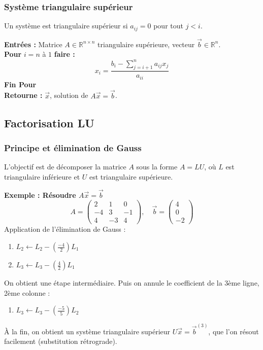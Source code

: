 \subsubsection{Système triangulaire supérieur}
Un système est triangulaire supérieur si $a_{ij} = 0$ pour tout $j < i$.

\begin{algorithme}
\textbf{Entrées :} Matrice $A \in \mathbb{R}^{n \times n}$ triangulaire supérieure, vecteur $\vec{b} \in \mathbb{R}^n$. \\
\textbf{Pour} $i = n$ à $1$ \textbf{faire :}
\[ x_i = \frac{b_i - \sum_{j=i+1}^{n} a_{ij}x_j}{a_{ii}} \]
\textbf{Fin Pour} \\
\textbf{Retourne :} $\vec{x}$, solution de $A\vec{x} = \vec{b}$.
\end{algorithme}

\subsection{Factorisation LU}

\subsubsection{Principe et élimination de Gauss}
L'objectif est de décomposer la matrice $A$ sous la forme $A = LU$, où $L$ est triangulaire inférieure et $U$ est triangulaire supérieure.

\textbf{Exemple : Résoudre $A\vec{x} = \vec{b}$}
\[ 
A = \begin{pmatrix} 2 & 1 & 0 \\ -4 & 3 & -1 \\ 4 & -3 & 4 \end{pmatrix}, \quad 
\vec{b} = \begin{pmatrix} 4 \\ 0 \\ -2 \end{pmatrix} 
\]
Application de l'élimination de Gauss :
\begin{enumerate}
    \item $L_2 \leftarrow L_2 - \left(\frac{-4}{2}\right)L_1$
    \item $L_3 \leftarrow L_3 - \left(\frac{4}{2}\right)L_1$
\end{enumerate}
On obtient une étape intermédiaire. Puis on annule le coefficient de la 3ème ligne, 2ème colonne :
\begin{enumerate}
    \item $L_3 \leftarrow L_3 - \left(\frac{-5}{5}\right)L_2$
\end{enumerate}
À la fin, on obtient un système triangulaire supérieur $U\vec{x} = \vec{b}^{(3)}$, que l'on résout facilement (substitution rétrograde).

